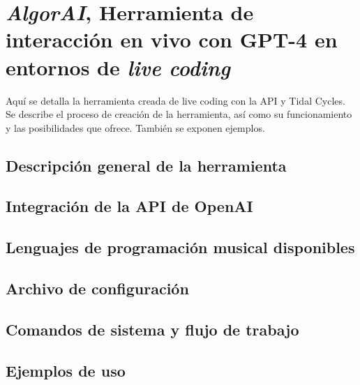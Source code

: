 \chapter{\textit{AlgorAI}, Herramienta de interacción en vivo con GPT-4 en entornos de \textit{live coding}}

Aquí se detalla la herramienta creada de live coding con la API y Tidal Cycles. Se describe el proceso de creación de la herramienta, así como su funcionamiento y las posibilidades que ofrece. También se exponen ejemplos.

\section{Descripción general de la herramienta}

\section{Integración de la API de OpenAI}

\section{Lenguajes de programación musical disponibles}

\section{Archivo de configuración}

\section{Comandos de sistema y flujo de trabajo}

\section{Ejemplos de uso}